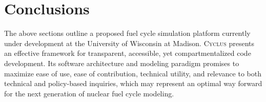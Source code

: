 \documentclass{anstrans}
\newcommand{\Cyclus}{\textsc{Cyclus }}
\begin{document}
\section{Conclusions}

The above sections outline a proposed fuel cycle simulation platform
currently under development at the University of Wisconsin at
Madison. \Cyclus presents an effective framework for transparent,
accessible, yet compartmentalized code development. Its software
architecture and modeling paradigm promises to maximize ease of use,
ease of contribution, technical utility, and relevance to both
technical and policy-based inquiries, which may represent an optimal
way forward for the next generation of nuclear fuel cycle modeling.




\nocite{huff_cyclus:_2010}
 

\end{document}
